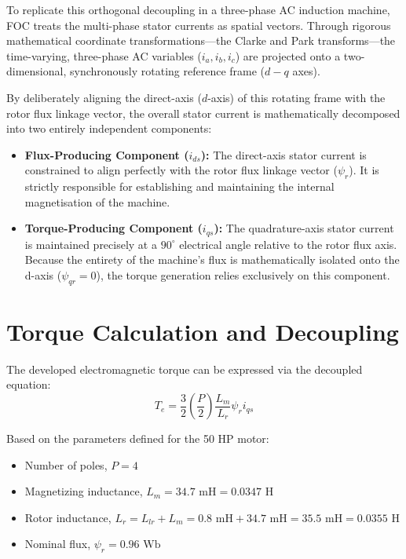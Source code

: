 \documentclass[12pt,a4paper]{report}
\begin{document}
To replicate this orthogonal decoupling in a three-phase AC induction machine, FOC treats the multi-phase stator currents as spatial vectors. Through rigorous mathematical coordinate transformations---the Clarke and Park transforms---the time-varying, three-phase AC variables ($i_{a}, i_{b}, i_{c}$) are projected onto a two-dimensional, synchronously rotating reference frame ($d-q$ axes).

By deliberately aligning the direct-axis ($d$-axis) of this rotating frame with the rotor flux linkage vector, the overall stator current is mathematically decomposed into two entirely independent components:
\begin{itemize}
    \item \textbf{Flux-Producing Component ($i_{ds}$):} The direct-axis stator current is constrained to align perfectly with the rotor flux linkage vector ($\psi_{r}$). It is strictly responsible for establishing and maintaining the internal magnetisation of the machine.
    \item \textbf{Torque-Producing Component ($i_{qs}$):} The quadrature-axis stator current is maintained precisely at a $90^\circ$ electrical angle relative to the rotor flux axis. Because the entirety of the machine's flux is mathematically isolated onto the d-axis ($\psi_{qr}=0$), the torque generation relies exclusively on this component.
\end{itemize}

\section{Torque Calculation and Decoupling}
The developed electromagnetic torque can be expressed via the decoupled equation:
\begin{equation}
T_{e} = \frac{3}{2} \left(\frac{P}{2}\right) \frac{L_{m}}{L_{r}} \psi_{r} i_{qs}
\end{equation}

Based on the parameters defined for the 50 HP motor:
\begin{itemize}
    \item Number of poles, $P = 4$
    \item Magnetizing inductance, $L_{m} = 34.7 \text{ mH} = 0.0347 \text{ H}$
    \item Rotor inductance, $L_{r} = L_{lr} + L_{m} = 0.8 \text{ mH} + 34.7 \text{ mH} = 35.5 \text{ mH} = 0.0355 \text{ H}$
    \item Nominal flux, $\psi_{r} = 0.96 \text{ Wb}$
\end{itemize}
\end{document}
